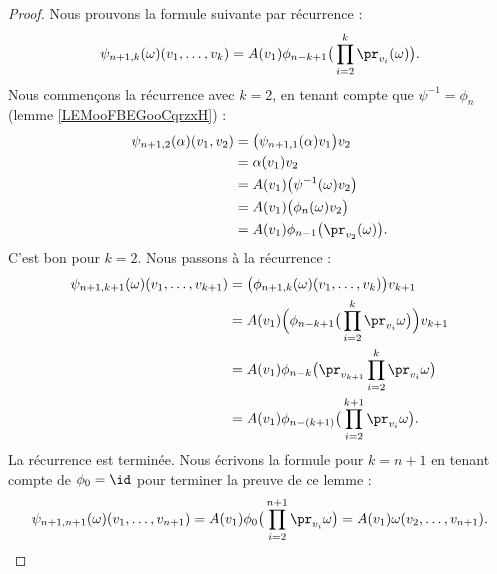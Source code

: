 \begin{proof}
	Nous prouvons la formule suivante par récurrence :
	\begin{equation}
		\psi_{n+1,k}(\omega)(v_1,\ldots, v_k)=A(v_1)\phi_{n-k+1}\big( \prod_{i=2}^k\pr_{v_i}(\omega) \big).
	\end{equation}
	Nous commençons la récurrence avec \( k=2\), en tenant compte que \( \psi^{-1}=\phi_n\) (lemme \ref{LEMooFBEGooCqrzxH}) :
	\begin{subequations}
		\begin{align}
			\psi_{n+1,2}(\alpha)(v_1,v_2) & =\big( \psi_{n+1,1}(\alpha)v_1 \big)v_2         \\
			                              & =\alpha(v_1)v_2                                 \\
			                              & =A(v_1)\big( \psi^{-1}(\omega)v_2 \big)         \\
			                              & =A(v_1)\big( \phi_n(\omega)v_2 \big)            \\
			                              & =A(v_1)\phi_{n-1}\big( \pr_{v_2}(\omega) \big).
		\end{align}
	\end{subequations}
	C'est bon pour \( k=2\). Nous passons à la récurrence :
	\begin{subequations}
		\begin{align}
			\psi_{n+1,k+1}(\omega)(v_1,\ldots, v_{k+1}) & =\big( \phi_{n+1,k}(\omega)(v_1,\ldots, v_k) \big)v_{k+1}                      \\
			                                            & =A(v_1)\Big( \phi_{n-k+1}\big( \prod_{i=2}^k\pr_{v_i}\omega \big) \Big)v_{k+1} \\
			                                            & =A(v_1)\phi_{n-k}\big( \pr_{v_{k+1}}\prod_{i=2}^k\pr_{v_i}\omega \big)         \\
			                                            & =A(v_1)\phi_{n-(k+1)}\big( \prod_{i=2}^{k+1}\pr_{v_i}\omega \big).
		\end{align}
	\end{subequations}
	La récurrence est terminée. Nous écrivons la formule pour \( k=n+1\) en tenant compte de \( \phi_0=\id\) pour terminer la preuve de ce lemme :
	\begin{equation}
		\psi_{n+1,n+1}(\omega)(v_1,\ldots, v_{n+1})=A(v_1)\phi_0\big( \prod_{i=2}^{n+1}\pr_{v_i}\omega \big)=A(v_1)\omega(v_2,\ldots, v_{n+1}).
	\end{equation}
\end{proof}

